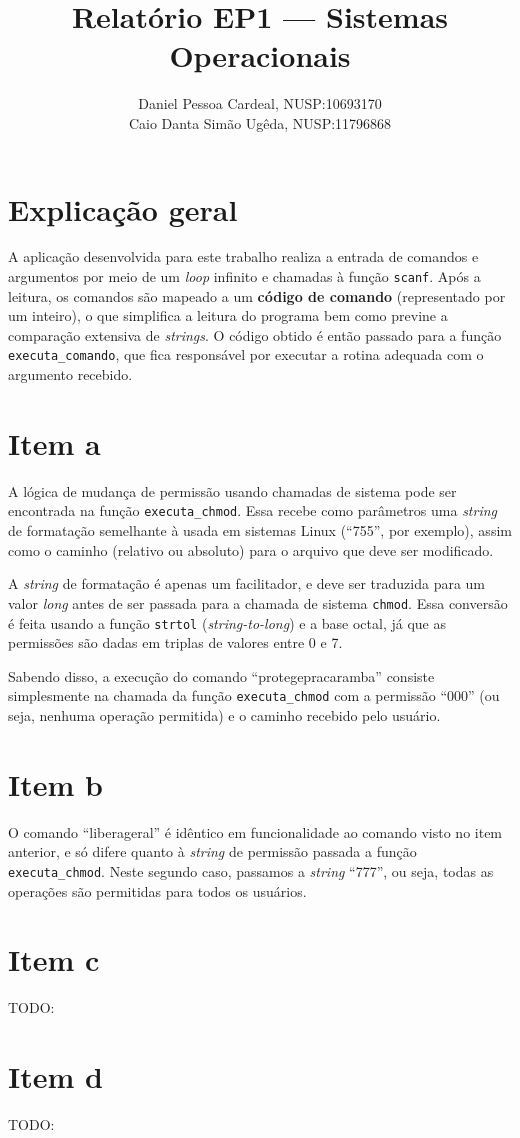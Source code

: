 \documentclass[12pt, twoside, a4paper]{article}
\title{
	Relatório EP1 --- Sistemas Operacionais
}
\author{
	Daniel Pessoa Cardeal, N\degree{}USP:10693170 \\
	Caio Danta Simão Ugêda, N\degree{}USP:11796868
}
\date{}
\newcommand{\todo}[1]{{\color{red} TODO: #1}}
\begin{document}
\maketitle

\section{Explicação geral}%

A aplicação desenvolvida para este trabalho realiza a entrada de comandos e argumentos por meio de um \textit{loop} infinito e chamadas à função \verb|scanf|. Após a leitura, os comandos são mapeado a um \textbf{código de comando} (representado por um inteiro), o que simplifica a leitura do programa bem como previne a comparação extensiva de \emph{strings}. O código obtido é então passado para a função \verb|executa_comando|, que fica responsável por executar a rotina adequada com o argumento recebido.

\section{Item a}%

A lógica de mudança de permissão usando chamadas de sistema pode ser encontrada na função \verb|executa_chmod|. Essa recebe como parâmetros uma \emph{string} de formatação semelhante à usada em sistemas Linux (``755'', por exemplo), assim como o caminho (relativo ou absoluto) para o arquivo que deve ser modificado.

A \emph{string} de formatação é apenas um facilitador, e deve ser traduzida para um valor \textit{long} antes de ser passada para a chamada de sistema \verb|chmod|. Essa conversão é feita usando a função \verb|strtol| (\textit{string-to-long}) e a base octal, já que as permissões são dadas em triplas de valores entre 0 e 7.

Sabendo disso, a execução do comando ``protegepracaramba'' consiste simplesmente na chamada da função \verb|executa_chmod| com a permissão ``000'' (ou seja, nenhuma operação permitida) e o caminho recebido pelo usuário.

\section{Item b}%

O comando ``liberageral'' é idêntico em funcionalidade ao comando visto no item anterior, e só difere quanto à \textit{string} de permissão passada a função \verb|executa_chmod|. Neste segundo caso, passamos a \emph{string} ``777'', ou seja, todas as operações são permitidas para todos os usuários.

\section{Item c}%
\todo{}

\section{Item d}%
\todo{}
\end{document}
